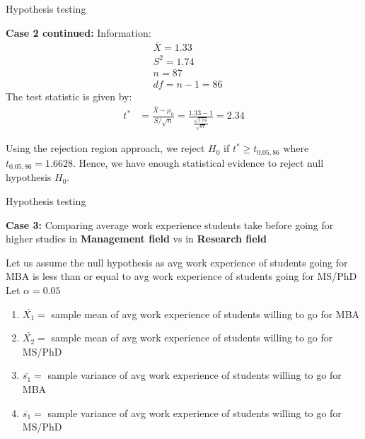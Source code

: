 \documentclass{beamer}
\begin{document}
    \begin{frame}{Hypothesis testing}
        \begin{block}{\textbf{Case 2 continued:}}
            Information:
             \begin{align}
                 &\bar{X}= 1.33\\
                 &S^2 = 1.74\\
                 &n=87\\
                 &df = n-1 = 86
             \end{align}
             The test statistic is given by:
             \begin{align}
                 t^* &= \frac{\bar{X} - \mu_0}{ S/ \sqrt{n}}
                 = \frac{1.33 - 1}{\frac{\sqrt{1.74}}{\sqrt{87}}}
                 = 2.34
             \end{align}

             Using the rejection region approach, we reject $H_0$ if $ t^* \geq t_{0.05,86}$ where $t_{0.05,86} = 1.6628$. Hence, we have enough statistical evidence to reject null hypothesis $H_0$.
        \end{block}
    \end{frame}


\begin{frame}{Hypothesis testing}

    \begin{block}{\textbf{Case 3:} Comparing average work experience students
            take before going for higher studies in \textbf{Management field} vs
            in \textbf{Research field} }

        Let us assume the null hypothesis as avg work experience of students
        going for MBA is less than or equal to avg work experience of students going
        for MS/PhD
        \\Let $\alpha=0.05$ \\
        \begin{enumerate}
            \item $\bar{X_1} = $ sample mean of avg work experience of students
                  willing to go for MBA \\
            \item $\bar{X_2} = $ sample mean of avg work experience of students
                  willing to go for MS/PhD \\
            \item $\bar{s_1} = $ sample variance of avg work experience of
                  students willing to go for MBA \\
            \item $\bar{s_1} = $ sample variance of avg work experience of
                  students willing to go for MS/PhD \\
        \end{enumerate}
    \end{block}

\end{frame}
\end{document}
